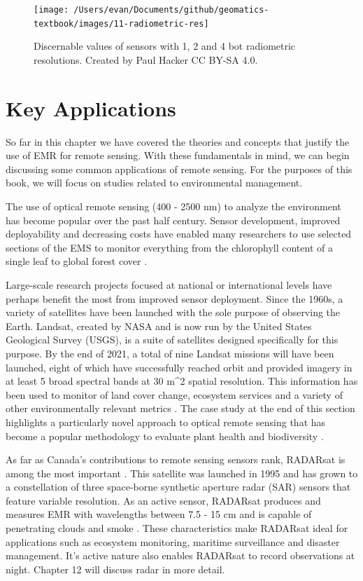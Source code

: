 \documentclass[
]{book}
\begin{document}
\begin{figure}
\texttt{[image: /Users/evan/Documents/github/geomatics-textbook/images/11-radiometric-res]} \caption{Discernable values of sensors with 1, 2 and 4 bot radiometric resolutions. Created by Paul Hacker CC BY-SA 4.0.}\label{fig:11-radiometric}
\end{figure}

\hypertarget{key-applications}{%
\section{Key Applications}\label{key-applications}}

So far in this chapter we have covered the theories and concepts that
justify the use of EMR for remote sensing. With these fundamentals in
mind, we can begin discussing some common applications of remote
sensing. For the purposes of this book, we will focus on studies related
to environmental management.

The use of optical remote sensing (400 - 2500 nm) to analyze the
environment has become popular over the past half century. Sensor
development, improved deployability and decreasing costs have enabled
many researchers to use selected sections of the EMS to monitor
everything from the chlorophyll content of a single leaf \citep{curran1989}
to global forest cover \citep{hansen2013}.

Large-scale research projects focused at national or international
levels have perhaps benefit the most from improved sensor deployment.
Since the 1960s, a variety of satellites have been launched with the
sole purpose of observing the Earth. Landsat, created by NASA and is now
run by the United States Geological Survey (USGS), is a suite of
satellites designed specifically for this purpose. By the end of 2021, a
total of nine Landsat missions will have been launched, eight of which
have successfully reached orbit and provided imagery in at least 5 broad
spectral bands at 30 m\^{}2 spatial resolution. This information has been
used to monitor of land cover change, ecosystem services and a variety
of other environmentally relevant metrics \citep{deel2012}. The case study at
the end of this section highlights a particularly novel approach to
optical remote sensing that has become a popular methodology to evaluate
plant health and biodiversity \citep{ustin2009, wang2018}.

As far as Canada's contributions to remote sensing sensors rank,
RADARsat is among the most important \citep{raney1991}. This satellite was
launched in 1995 and has grown to a constellation of three space-borne
synthetic aperture radar (SAR) sensors that feature variable resolution.
As an active sensor, RADARsat produces and measures EMR with wavelengths
between 7.5 - 15 cm and is capable of penetrating clouds and smoke
\citep{raney1991}. These characteristics make RADARsat ideal for applications
such as ecosystem monitoring, maritime surveillance and disaster
management. It's active nature also enables RADARsat to record
observations at night. Chapter 12 will discuss radar in more detail.
\end{document}
